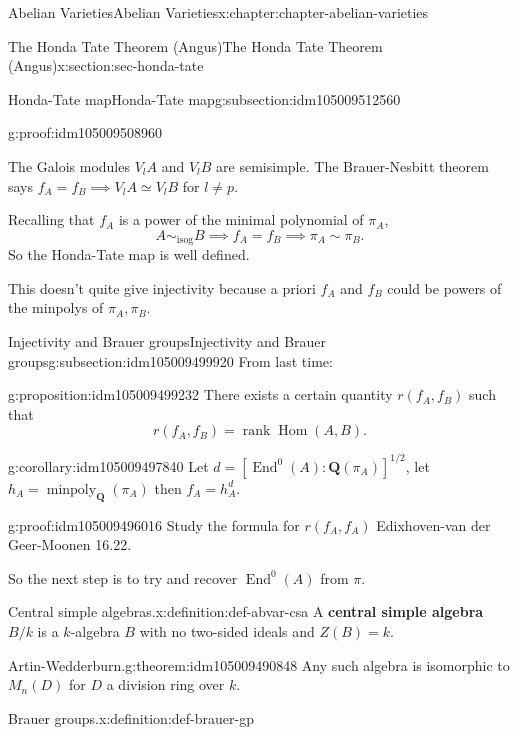 \documentclass[oneside,10pt,]{book}
\newcommand{\terminology}[1]{\textbf{#1}}
\numberwithin{equation}{section}
\newcommand{\lb}{[}
\newcommand{\rb}{]}
\newcommand{\QQ}{\mathbf{Q}}
\DeclareMathOperator{\End}{End}
\DeclareMathOperator{\Hom}{Hom}
\DeclareMathOperator{\rank}{rank}
\begin{document}
\begin{chapterptx}{Abelian Varieties}{}{Abelian Varieties}{}{}{x:chapter:chapter-abelian-varieties}
\begin{sectionptx}{The Honda Tate Theorem (Angus)}{}{The Honda Tate Theorem (Angus)}{}{}{x:section:sec-honda-tate}
\begin{subsectionptx}{Honda-Tate map}{}{Honda-Tate map}{}{}{g:subsection:idm105009512560}
\begin{proofptx}{}{g:proof:idm105009508960}
\par
The Galois modules \(V_lA\) and \(V_l B\) are semisimple. The Brauer-Nesbitt theorem says \(f_A = f_B \implies V_lA \simeq V_lB \) for \(l\ne p\).%
\end{proofptx}
Recalling that \(f_A\) is a power of the minimal polynomial of \(\pi_A\),%
\begin{equation*}
A \sim_{\text{isog}} B\implies  f_A =f_B \implies \pi_A \sim \pi_B\text{.}
\end{equation*}
So the Honda-Tate map is well defined.%
\par
This doesn't quite give injectivity because a priori \(f_A\) and \(f_B\) could be powers of the minpolys of \(\pi_A, \pi_B\).%
\end{subsectionptx}
%
%
\typeout{************************************************}
\typeout{************************************************}
%
\begin{subsectionptx}{Injectivity and Brauer groups}{}{Injectivity and Brauer groups}{}{}{g:subsection:idm105009499920}
From last time:%
\begin{proposition}{}{}{g:proposition:idm105009499232}%
There exists a certain quantity \(r(f_A, f_B)\) such that%
\begin{equation*}
r(f_A, f_B) = \rank \Hom(A,B)\text{.}
\end{equation*}
%
\end{proposition}
\begin{corollary}{}{}{g:corollary:idm105009497840}%
Let \(d = \lb \End^0(A) : \QQ(\pi_A) \rb^{1/2}\), let \(h_A = \operatorname{minpoly}_\QQ(\pi_A)\) then \(f_A = h_A^d\).%
\end{corollary}
\begin{proofptx}{}{g:proof:idm105009496016}
Study the formula for \(r(f_A, f_A)\) Edixhoven-van der Geer-Moonen 16.22.%
\end{proofptx}
So the next step is to try and recover \(\End^0(A)\) from \(\pi\).%
\begin{definition}{Central simple algebras.}{x:definition:def-abvar-csa}%
A \terminology{central simple algebra} \(B/k\) is a \(k\)-algebra \(B\) with no two-sided ideals and \(Z(B) = k\).%
\end{definition}
\begin{theorem}{Artin-Wedderburn.}{}{g:theorem:idm105009490848}%
Any such algebra is isomorphic to \(M_n(D)\) for \(D\) a division ring over \(k\).%
\end{theorem}
\begin{definition}{Brauer groups.}{x:definition:def-brauer-gp}%

\end{definition}
\end{subsectionptx}
\end{sectionptx}
\end{chapterptx}
\end{document}
